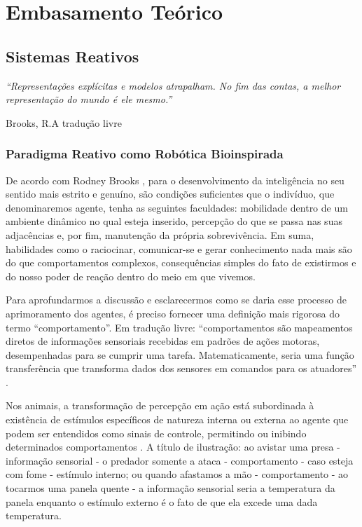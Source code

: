 \chapter{Embasamento Teórico}
\section{Sistemas Reativos}
\epigraph{ 
	  \textit{``Representações explícitas e modelos atrapalham. No fim das contas, a melhor representação do mundo é ele mesmo.''} 
	 }
	  { Brooks, R.A \cite{brooks} tradução livre} 
	  

\subsection{Paradigma Reativo como Robótica Bioinspirada} 

De acordo com Rodney Brooks \cite{brooks}, para o desenvolvimento da inteligência no seu sentido mais estrito e genuíno, são condições 
suficientes que o indivíduo, que denominaremos agente, tenha as seguintes faculdades: mobilidade dentro de um ambiente dinâmico no qual esteja 
inserido, percepção do que se passa nas suas adjacências e, por fim, manutenção da própria sobrevivência.
Em suma, habilidades como o raciocinar, comunicar-se e gerar conhecimento nada mais são do que comportamentos complexos, consequências simples do 
fato 
de existirmos e do nosso poder de reação dentro do meio em que vivemos.

Para aprofundarmos a discussão e esclarecermos como se daria esse processo de aprimoramento dos agentes, é preciso fornecer uma  definição 
mais rigorosa do termo ``comportamento''.
Em tradução livre: ``comportamentos são mapeamentos diretos de informações sensoriais recebidas em  
padrões de ações motoras, desempenhadas para se cumprir uma tarefa. Matematicamente, seria uma função transferência que transforma dados dos 
sensores em comandos para os atuadores'' \cite{murphy}.

Nos animais, a transformação de percepção em ação está subordinada à existência de estímulos específicos de natureza interna ou externa 
ao agente que podem ser entendidos como sinais de controle, permitindo ou inibindo determinados comportamentos \cite{murphy}.
A título de ilustração: ao avistar uma presa - informação sensorial - o predador somente a ataca - comportamento - caso esteja com fome - estímulo 
interno; ou quando afastamos a mão - comportamento - ao tocarmos uma panela quente - a informação sensorial seria a temperatura da panela enquanto o 
estímulo externo é o fato de que ela excede uma dada temperatura.

